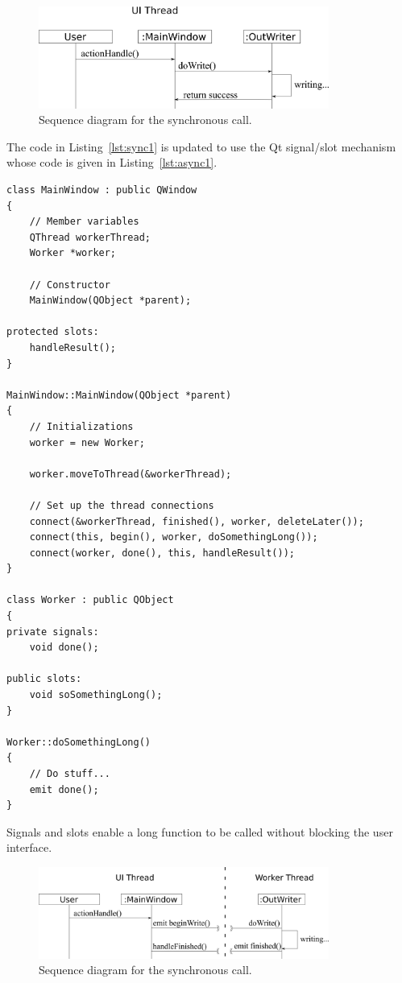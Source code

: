 \begin{figure}[tb]
  \begin{center}
   \includegraphics[width=3.75in]{figs/writer_sync}
  \end{center}
  \caption{Sequence diagram for the synchronous call.}
\label{fig:sync1}
\end{figure}%

The code in Listing~\ref{lst:sync1} is updated to use the Qt signal/slot mechanism whose code is given in Listing~\ref{lst:async1}.

\begin{listing}
\begin{verbatim}
class MainWindow : public QWindow
{
	// Member variables
	QThread workerThread;
	Worker *worker;
	
	// Constructor
	MainWindow(QObject *parent);
	
protected slots:
	handleResult();
}
	
MainWindow::MainWindow(QObject *parent)
{
	// Initializations
	worker = new Worker;
	
	worker.moveToThread(&workerThread);
	
	// Set up the thread connections
	connect(&workerThread, finished(), worker, deleteLater());
	connect(this, begin(), worker, doSomethingLong());
	connect(worker, done(), this, handleResult());
}

class Worker : public QObject
{
private signals:
	void done();
	
public slots:
	void soSomethingLong();
}

Worker::doSomethingLong()
{
	// Do stuff...
	emit done();
}

\end{verbatim}
\caption{Signals and slots enable a long function to be called without blocking the user interface.}\label{lst:async1}
\end{listing}

\begin{figure}[tb]
  \begin{center}
   \includegraphics[width=3.75in]{figs/writer_async}
  \end{center}
  \caption{Sequence diagram for the synchronous call.}
\label{fig:async1}
\end{figure}%

